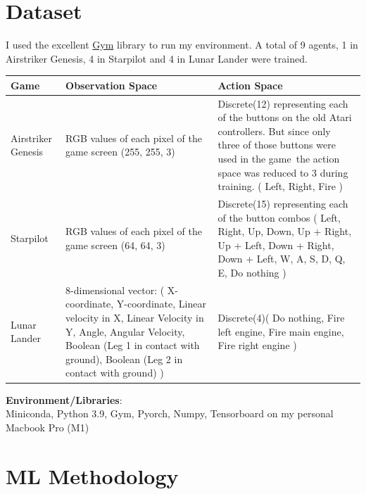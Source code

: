 \documentclass[paper=a4, fontsize=11pt, margin=1in]{scrartcl}
\numberwithin{equation}{section}		%
\numberwithin{figure}{section}			%
\numberwithin{table}{section}				%
\begin{document}
\begin{itemize}
\section{Dataset}
I used the excellent \href{https://github.com/openai/gym}{Gym} library to run my environment. A total of 9 agents, 1 in Airstriker Genesis, 4 in Starpilot and 4 in Lunar Lander were trained. 


\begin{longtable}{|p{2cm}|p{6cm}|p{4cm}|} %
\hline\hline %
\textbf{Game} & \textbf{Observation Space} & \textbf{Action Space} \\  %
\hline
Airstriker Genesis & RGB values of each pixel of the game screen \newline(255, 255, 3) & Discrete(12) representing each of the buttons on the old Atari controllers. But since only three of those buttons were used in the game\, the action space was reduced to 3 during training.\newline
( Left, Right, Fire )\\
\hline
Starpilot & RGB values of each pixel of the game screen \newline (64, 64, 3)& Discrete(15) representing each of the button combos \newline  ( Left, Right, Up, Down, Up + Right, Up + Left, Down + Right, Down + Left, W, A, S, D, Q, E, Do nothing ) \\
\hline
Lunar Lander & 8-dimensional vector: \newline 
( X-coordinate, Y-coordinate, Linear velocity in X, Linear Velocity in Y, Angle, Angular Velocity, Boolean (Leg 1 in contact with ground), Boolean (Leg 2 in contact with ground) )& Discrete(4)\newline ( Do nothing, Fire left engine, Fire main engine, Fire right engine ) \\
\hline
\end{longtable}

\textbf{Environment/Libraries}: \\

Miniconda, Python 3.9, Gym, Pyorch, Numpy, Tensorboard on my personal Macbook Pro (M1)

\section{ML Methodology}


\end{itemize}
\end{document}
